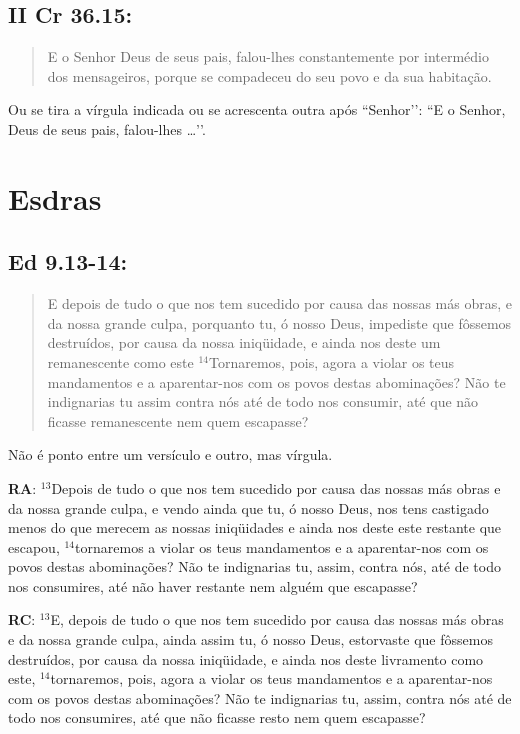 \subsection{II Cr 36.15:}
\begin{quote}
    \small
E o Senhor Deus de seus pais\uline{,} falou-lhes constantemente por intermédio dos mensageiros, porque se compadeceu do seu povo e da sua habitação.
\end{quote}
 
Ou se tira a vírgula indicada ou se acrescenta outra após ``Senhor’’: ``E o Senhor, Deus de seus pais, falou-lhes \ldots’’.

\section{Esdras}
\subsection{Ed 9.13-14:}
\begin{quote}
    \small
E depois de tudo o que nos tem sucedido por causa das nossas más obras, e da nossa grande culpa, porquanto tu, ó nosso Deus, impediste que fôssemos destruídos, por causa da nossa iniqüidade, e ainda nos deste um remanescente como este $^{\mathrm{14}}$Tornaremos, pois, agora a violar os teus mandamentos e a aparentar-nos com os povos destas abominações? Não te indignarias tu assim contra nós até de todo nos consumir, até que não ficasse remanescente nem quem escapasse?
\end{quote}

Não é ponto entre um versículo e outro, mas vírgula.

\textbf{RA}: $^{\mathrm{13}}$Depois de tudo o que nos tem sucedido por causa
das nossas más obras e da nossa grande culpa, e vendo ainda que tu, ó
nosso Deus, nos tens castigado menos do que merecem as nossas
iniqüidades e ainda nos deste este restante que escapou,
$^{\mathrm{14}}$tornaremos a violar os teus mandamentos e a
aparentar-nos com os povos destas abominações? Não te indignarias tu,
assim, contra nós, até de todo nos consumires, até não haver restante
nem alguém que escapasse?

\textbf{RC}: $^{\mathrm{13}}$E, depois de tudo o que nos tem sucedido por causa
das nossas más obras e da nossa grande culpa, ainda assim tu, ó nosso
Deus, estorvaste que fôssemos destruídos, por causa da nossa
iniqüidade, e ainda nos deste livramento como este,
$^{\mathrm{14}}$tornaremos, pois, agora a violar os teus mandamentos e
a aparentar-nos com os povos destas abominações? Não te indignarias
tu, assim, contra nós até de todo nos consumires, até que não ficasse
resto nem quem escapasse?

